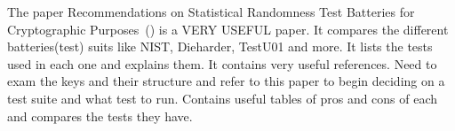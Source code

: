 The paper Recommendations on Statistical Randomness Test Batteries for Cryptographic Purposes~(\cite{10.1145/3447773}) is a VERY USEFUL paper. It compares the different batteries(test) suits like NIST, Dieharder, TestU01 and more. It lists the tests used in each one and explains them. It contains very useful references. Need to exam the keys and their structure and refer to this paper to begin deciding on a test suite and what test to run. Contains useful tables of pros and cons of each and compares the tests they have.
